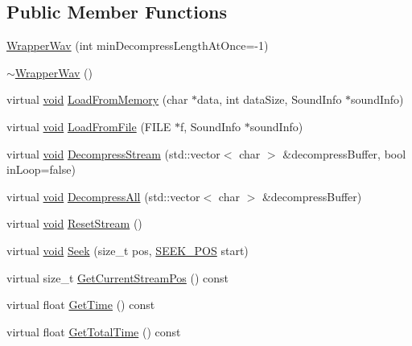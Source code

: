 \subsection*{Public Member Functions}
\begin{DoxyCompactItemize}
\item 
\mbox{\hyperlink{classnjli_1_1_wrapper_wav_a53dde3ca2091dae93b2153f32dba6c4d}{Wrapper\+Wav}} (int min\+Decompress\+Length\+At\+Once=-\/1)
\item 
\mbox{\hyperlink{classnjli_1_1_wrapper_wav_a8b4fecfd6d212c0df75bf5fa34239c51}{$\sim$\+Wrapper\+Wav}} ()
\item 
virtual \mbox{\hyperlink{_thread_8h_af1e856da2e658414cb2456cb6f7ebc66}{void}} \mbox{\hyperlink{classnjli_1_1_wrapper_wav_a93b83be038f6d2bc269720b0fa91d841}{Load\+From\+Memory}} (char $\ast$data, int data\+Size, Sound\+Info $\ast$sound\+Info)
\item 
virtual \mbox{\hyperlink{_thread_8h_af1e856da2e658414cb2456cb6f7ebc66}{void}} \mbox{\hyperlink{classnjli_1_1_wrapper_wav_a43b8306e554b224968ef436020416765}{Load\+From\+File}} (F\+I\+LE $\ast$f, Sound\+Info $\ast$sound\+Info)
\item 
virtual \mbox{\hyperlink{_thread_8h_af1e856da2e658414cb2456cb6f7ebc66}{void}} \mbox{\hyperlink{classnjli_1_1_wrapper_wav_aa84e533c55261000594f1889f60d1ef5}{Decompress\+Stream}} (std\+::vector$<$ char $>$ \&decompress\+Buffer, bool in\+Loop=false)
\item 
virtual \mbox{\hyperlink{_thread_8h_af1e856da2e658414cb2456cb6f7ebc66}{void}} \mbox{\hyperlink{classnjli_1_1_wrapper_wav_a530b83b423d29c785889f9783ab08b9b}{Decompress\+All}} (std\+::vector$<$ char $>$ \&decompress\+Buffer)
\item 
virtual \mbox{\hyperlink{_thread_8h_af1e856da2e658414cb2456cb6f7ebc66}{void}} \mbox{\hyperlink{classnjli_1_1_wrapper_wav_ab24f4e589680e0abe321e105f01468bf}{Reset\+Stream}} ()
\item 
virtual \mbox{\hyperlink{_thread_8h_af1e856da2e658414cb2456cb6f7ebc66}{void}} \mbox{\hyperlink{classnjli_1_1_wrapper_wav_aa75e013ec22ca84b54ee33428dcd3d09}{Seek}} (size\+\_\+t pos, \mbox{\hyperlink{classnjli_1_1_i_sound_file_wrapper_ab4b07720cb2823b4f3f9fa98ee07a6e7}{S\+E\+E\+K\+\_\+\+P\+OS}} start)
\item 
virtual size\+\_\+t \mbox{\hyperlink{classnjli_1_1_wrapper_wav_ac7f741a2d2db3126eec69b64eb2cacfc}{Get\+Current\+Stream\+Pos}} () const
\item 
virtual float \mbox{\hyperlink{classnjli_1_1_wrapper_wav_a0cfe149e0e1089f153401f3c80a222df}{Get\+Time}} () const
\item 
virtual float \mbox{\hyperlink{classnjli_1_1_wrapper_wav_ae281e2ac23707e6eb2c1f2e7fcb58881}{Get\+Total\+Time}} () const
\end{DoxyCompactItemize}
